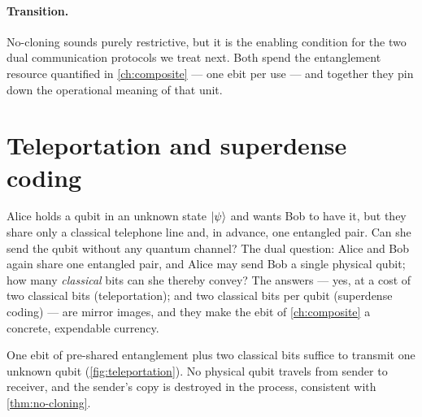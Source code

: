 \paragraph{Transition.}
No-cloning sounds purely restrictive, but it is the enabling condition
for the two dual communication protocols we treat next. Both spend the
entanglement resource quantified in \cref{ch:composite} --- one ebit
per use --- and together they pin down the operational meaning of that
unit.

\section{Teleportation and superdense coding}
\label{sec:teleportation}

\begin{phenomenon}
Alice holds a qubit in an unknown state $\ket{\psi}$ and wants Bob to
have it, but they share only a classical telephone line and, in
advance, one entangled pair. Can she send the qubit without any quantum
channel? The dual question: Alice and Bob again share one entangled
pair, and Alice may send Bob a single physical qubit; how many
\emph{classical} bits can she thereby convey? The answers --- yes, at a
cost of two classical bits (teleportation); and two classical bits per
qubit (superdense coding) --- are mirror images, and they make the ebit
of \cref{ch:composite} a concrete, expendable currency.
\end{phenomenon}

\begin{statement}
\label{stmt:teleportation}
One ebit of pre-shared entanglement plus two classical bits suffice to
transmit one unknown qubit (\cref{fig:teleportation}). No physical qubit
travels from sender to receiver, and the sender's copy is destroyed in
the process, consistent with \cref{thm:no-cloning}.
\end{statement}

